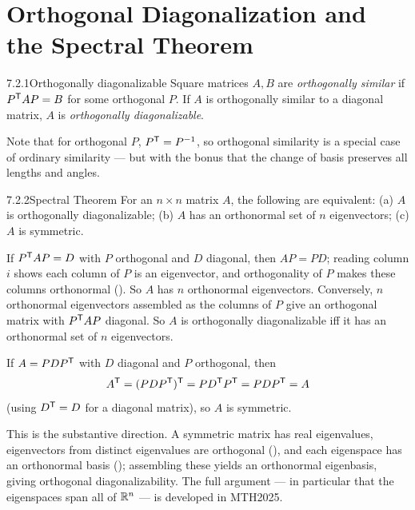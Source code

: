 \section{Orthogonal Diagonalization and the Spectral Theorem}
\label{sec:7.2}

\begin{defns}{7.2.1}{Orthogonally diagonalizable}
Square matrices $A,B$ are \emph{orthogonally similar} if $P^{\mathsf{T}} AP=B$ for some orthogonal $P$. If $A$ is orthogonally similar to a diagonal matrix, $A$ is \emph{orthogonally diagonalizable}.
\end{defns}

Note that for orthogonal $P$, $P^{\mathsf{T}}=P^{-1}$, so orthogonal similarity is a special case of ordinary similarity --- but with the bonus that the change of basis preserves all lengths and angles.

\begin{thms}{7.2.2}{Spectral Theorem}
For an $n\times n$ matrix $A$, the following are equivalent:
\textup{(a)} $A$ is orthogonally diagonalizable;
\textup{(b)} $A$ has an orthonormal set of $n$ eigenvectors;
\textup{(c)} $A$ is symmetric.
\end{thms}

\begin{prf}
 If $P^{\mathsf{T}} AP=D$ with $P$ orthogonal and $D$ diagonal, then $AP=PD$; reading column $i$ shows each column of $P$ is an eigenvector, and orthogonality of $P$ makes these columns orthonormal (). So $A$ has $n$ orthonormal eigenvectors. Conversely, $n$ orthonormal eigenvectors assembled as the columns of $P$ give an orthogonal matrix with $P^{\mathsf{T}} AP$ diagonal. So $A$ is orthogonally diagonalizable iff it has an orthonormal set of $n$ eigenvectors.

 If $A=PDP^{\mathsf{T}}$ with $D$ diagonal and $P$ orthogonal, then
\[
A^{\mathsf{T}}=(PDP^{\mathsf{T}})^{\mathsf{T}}=PD^{\mathsf{T}} P^{\mathsf{T}}=PDP^{\mathsf{T}}=A
\]
(using $D^{\mathsf{T}}=D$ for a diagonal matrix), so $A$ is symmetric.

 This is the substantive direction. A symmetric matrix has real eigenvalues, eigenvectors from distinct eigenvalues are orthogonal (), and each eigenspace has an orthonormal basis (); assembling these yields an orthonormal eigenbasis, giving orthogonal diagonalizability. The full argument --- in particular that the eigenspaces span all of $\mathbb{R}^n$ --- is developed in MTH2025.
\end{prf}

